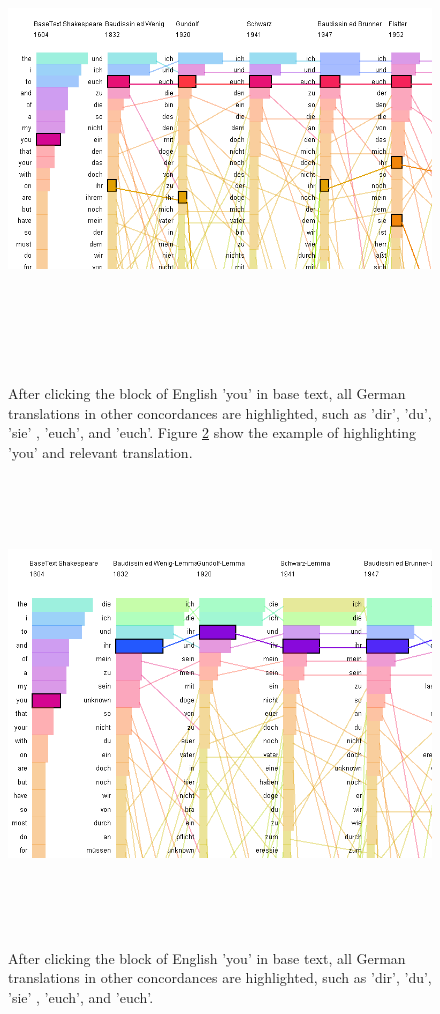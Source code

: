 \begin{figure}[H]
	\centering	
	\includegraphics[width=16cm, height=12cm]{Figs/You-In-Frequency}\\[1ex]
	\caption{} After clicking the block of English 'you' in base text, all German translations in other concordances are highlighted, such as  'dir', 'du', 'sie' , 'euch', and 'euch'. Figure \ref{fig:youInLemma} show the example of highlighting 'you' and relevant translation.
	\label{fig:youInFreq}
\end{figure} 
\begin{figure}[H]
	\centering	
	\includegraphics[width=16cm, height=12cm]{Figs/You-In-Lemma}\\[1ex]
	\caption{} After clicking the block of English 'you' in base text, all German translations in other concordances are highlighted, such as  'dir', 'du', 'sie' , 'euch', and 'euch'.
	\label{fig:youInLemma}
\end{figure} 

